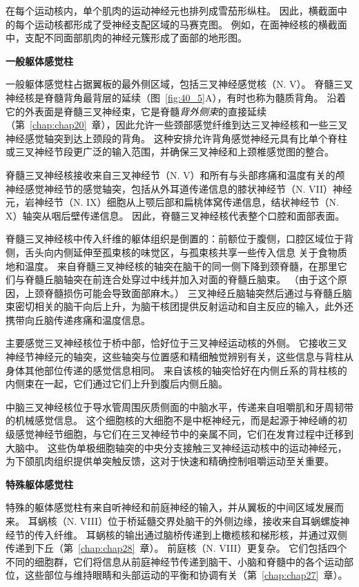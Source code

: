 在每个运动核内，单个肌肉的运动神经元也排列成雪茄形纵柱。
因此，横截面中的每个运动核都形成了受神经支配区域的马赛克图。
例如，在面神经核的横截面中，支配不同面部肌肉的神经元簇形成了面部的地形图。


\textbf{一般躯体感觉柱}

一般躯体感觉柱占据翼板的最外侧区域，包括三叉神经感觉核（N. V）。
脊髓三叉神经核是脊髓背角最背层的延续（图~\ref{fig:40_5}A），有时也称为髓质背角。
沿着它的外表面是脊髓三叉神经束，它是脊髓\textit{背外侧束}的直接延续（第~\ref{chap:chap20}~章），因此允许一些颈部感觉纤维到达三叉神经核和一些三叉神经感觉轴突到达上颈段的背角。
这种安排允许背角感觉神经元具有比单个脊柱或三叉神经节段更广泛的输入范围，并确保三叉神经和上颈椎感觉图的整合。


脊髓三叉神经核接收来自三叉神经节（N. V）和所有与头部疼痛和温度有关的颅神经感觉神经节的感觉轴突，包括从外耳道传递信息的膝状神经节（N. VII）神经元，岩神经节（N. IX）细胞从上颚后部和扁桃体窝传递信息，结状神经节（N. X）轴突从咽后壁传递信息。
因此，脊髓三叉神经核代表整个口腔和面部表面。


脊髓三叉神经核中传入纤维的躯体组织是倒置的：前额位于腹侧，口腔区域位于背侧，舌头向内侧延伸至孤束核的味觉区，与孤束核共享一些传入信息 关于食物质地和温度。
来自脊髓三叉神经核的轴突在脑干的同一侧下降到颈脊髓，在那里它们与脊髓丘脑轴突在前连合处穿过中线并加入对面的脊髓丘脑束。
（由于这个原因，上颈脊髓损伤可能会导致面部麻木。）
三叉神经丘脑轴突然后通过与脊髓丘脑束密切相关的脑干向后上升，为脑干核团提供反射运动和自主反应的输入，此外还携带向丘脑传递疼痛和温度信息。


主要感觉三叉神经核位于桥中部，恰好位于三叉神经运动核的外侧。
它接收三叉神经节神经元的轴突，这些轴突与位置感和精细触觉辨别有关，这些信息与背柱从身体其他部位传递的感觉信息相同。
来自该核的轴突恰好在内侧丘系的背柱核的内侧束在一起，它们通过它们上升到腹后内侧丘脑。


中脑三叉神经核位于导水管周围灰质侧面的中脑水平，传递来自咀嚼肌和牙周韧带的机械感觉信息。
这个细胞核的大细胞不是中枢神经元，而是起源于神经嵴的初级感觉神经节细胞，与它们在三叉神经节中的亲属不同，它们在发育过程中迁移到大脑中。
这些伪单极细胞轴突的中央分支接触三叉神经运动核中的运动神经元，为下颌肌肉组织提供单突触反馈，这对于快速和精确控制咀嚼运动至关重要。


\textbf{特殊躯体感觉柱}

特殊的躯体感觉柱有来自听神经和前庭神经的输入，并从翼板的中间区域发展而来。
耳蜗核（N. VIII）位于桥延髓交界处脑干的外侧边缘，接收来自耳蜗螺旋神经节的传入纤维。
耳蜗核的输出通过脑桥传递到上橄榄核和梯形核，并通过双侧传递到下丘（第~\ref{chap:chap28}~章）。
前庭核（N. VIII）更复杂。
它们包括四个不同的细胞群，它们将信息从前庭神经节传递到脑干、小脑和脊髓中的各个运动部位，这些部位与维持眼睛和头部运动的平衡和协调有关（第~\ref{chap:chap27}~章）。


